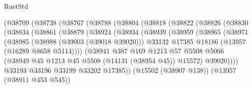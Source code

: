 \begin{lexlean}{RustStd}
\begin{coremodule}
                    (@38709
                      (@38738
                        (@38767
                          (@38788
                            (@38804
                              (@38818
                                (@38822
                                  (@38826
                                    (@38830
                                      (@38834
                                        (@38861
                                          (@38879
                                            (@38924
                                              (@38934
                                                (@38939
                                                  (@38959
                                                    (@38965
                                                      (@38971
                                                        (@38985
                                                          (@38988 (@39003 (@39018 @39020)))
                                                          @33132
                                                          @17385
                                                          @18186
                                                          (@13957 (@16289 @8658 @5114))))
                                                      (@38941
                                                        @387
                                                        @169
                                                        @1213
                                                        @57
                                                        @5508
                                                        @5066
                                                        (@38949
                                                          @45
                                                          @1213
                                                          @45
                                                          @5508
                                                          (@14131 (@38954 @45))
                                                          @15572)
                                                        @39020))))
                                                @33193
                                                @33196
                                                @33199
                                                @33202
                                                @17385))
                                            (@15502 (@38907 @138))
                                            (@13957 (@38911 @453 @545))

\end{coremodule}
\end{lexlean}
